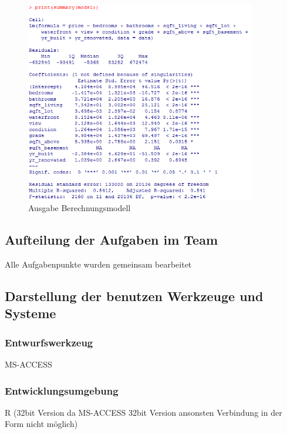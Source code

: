 \begin{figure}[!htb]
        \begin{minipage}{1\textwidth}
                \centering
                \includegraphics[width=0.90\textwidth]{pics/rjdbc8.png}\par\vspace{0cm}
                \caption{Ausgabe Berechnungsmodell}
                \label{fig:rjdbc8}
        \end{minipage}
\end{figure}





\subsection*{Aufteilung der Aufgaben im Team}
Alle Aufgabenpunkte wurden gemeinsam bearbeitet
\subsection*{Darstellung der benutzen Werkzeuge und Systeme}
\subsubsection*{Entwurfswerkzeug}
MS-ACCESS
\subsubsection*{Entwicklungsumgebung}
R (32bit Version da MS-ACCESS 32bit Version ansonsten Verbindung in der Form nicht möglich)

